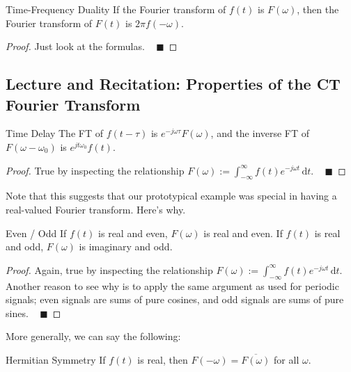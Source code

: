 \begin{theorem}{Time-Frequency Duality}
    If the Fourier transform of $f(t)$ is $F(\omega)$,
    then the Fourier transform of $F(t)$ is $2\pi f(-\omega)$.
\end{theorem}

\begin{proof}
    Just look at the formulas. ~ $\blacksquare$
\end{proof}

\subsection{Lecture and Recitation: Properties of the CT Fourier Transform}

\begin{theorem}{Time Delay}
    The FT of $f(t - \tau)$ is $e^{-j \omega \tau} F(\omega)$,
    and the inverse FT of $F(\omega - \omega_0)$ is $e^{jt \omega_0}f(t)$.
\end{theorem}

\begin{proof}
    True by inspecting the relationship
    $F(\omega) := \int_{-\infty}^{\infty} f(t) e^{-j\omega t} \, \mathrm{d}t$. ~ $\blacksquare$
\end{proof}

Note that this suggests that our prototypical example
was special in having a real-valued Fourier transform.  Here's why.

\begin{theorem}{Even / Odd}
    If $f(t)$ is real and even, $F(\omega)$ is real and even.
    If $f(t)$ is real and odd, $F(\omega)$ is imaginary and odd.
\end{theorem}

\begin{proof}
    Again, true by inspecting the relationship
    $F(\omega) := \int_{-\infty}^{\infty} f(t) e^{-j\omega t} \, \mathrm{d}t$.
    Another reason to see why is to apply the same argument as used for periodic signals;
    even signals are sums of pure cosines, and odd signals are sums of pure sines.
    ~ $\blacksquare$
\end{proof}

More generally, we can say the following:

\begin{theorem}{Hermitian Symmetry}
    If $f(t)$ is real,
    then $F(-\omega) = \overline{F(\omega)}$ for all $\omega$.
\end{theorem}

